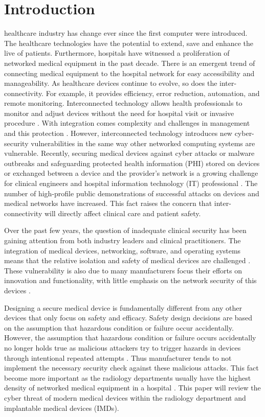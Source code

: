 \documentclass{IEEEtran}
\begin{document}
\section{Introduction}
 healthcare industry has change ever since the first computer were introduced. The healthcare technologies have the potential to extend, save and enhance the live of patients. Furthermore, hospitals have witnessed a proliferation of networked medical equipment in the past decade. There is an emergent trend of connecting medical equipment to the hospital network for easy accessibility and manageability. As healthcare devices continue to evolve, so does the inter-connectivity. For example, it provides efficiency, error reduction, automation, and remote monitoring. Interconnected technology allows health professionals to monitor and adjust devices without the need for hospital visit or invasive procedure \cite{coventry2018cybersecurity}. With integration comes complexity and challenges in management and this protection \cite{williams2015cybersecurity}. However, interconnected technology introduces new cyber-security vulnerabilities in the same way other networked computing systems are vulnerable. Recently, securing medical devices against cyber attacks or malware outbreaks and safeguarding protected health information (PHI) stored on devices or exchanged between a device and the provider's network is a growing challenge for clinical engineers and hospital information technology (IT) professional \cite{wirth2011cybercrimes}. The number of high-profile public demonstrations of successful attacks on devices and medical networks have increased. This fact raises the concern that inter-connectivity will directly affect clinical care and patient safety. \par
Over the past few years, the question of inadequate clinical security has been gaining attention from both industry leaders and clinical practitioners. The integration of medical devices, networking, software, and operating systems means that the relative isolation and safety of medical devices are challenged \cite{williams2015cybersecurity}. These vulnerability is also due to many manufacturers focus their efforts on innovation and functionality, with little emphasis on the network security of this devices \cite{moses2015lack}. \par
Designing a secure medical device is fundamentally different from  any other devices that only focus on safety and efficacy. Safety design decisions are based on the assumption that hazardous condition or failure occur accidentally. However, the assumption that hazardous condition or failure occurs accidentally no longer holds true as malicious attackers try to trigger hazards in devices through intentional repeated attempts \cite{Ray}. Thus manufacturer tends to not implement the necessary security check against these malicious attacks. This fact become more important as the radiology departments usually have the highest density of networked medical equipment in a hospital \cite{moses2015lack}. This paper will review the cyber threat of modern medical devices within the radiology department and implantable medical devices (IMDs).
\end{document}
